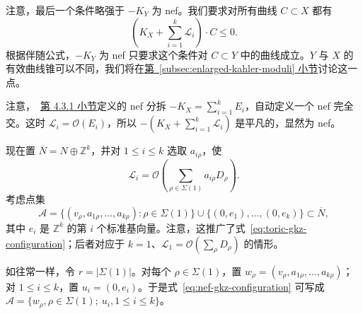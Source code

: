 注意，最后一个条件略强于 $-K_Y$ 为 nef。我们要求对所有曲线 $C\subset X$ 都有
\[
\left(K_X+\sum_{i=1}^k\mathcal L_i\right)\cdot C\leq0.
\]
根据伴随公式，$-K_Y$ 为 nef 只要求这个条件对 $C\subset Y$ 中的曲线成立。$Y$ 与 $X$ 的有效曲线锥可以不同，我们将在\hyperref[subsec:enlarged-kahler-moduli]{第~\ref*{subsec:enlarged-kahler-moduli} 小节}讨论这一点。

注意，~\hyperref[subsec:nef-partitions]{第 4.3.1 小节}定义的 nef 分拆
$-K_X=\sum_{i=1}^kE_i$，自动定义一个 nef 完全交。这时 $\mathcal L_i=\mathcal O(E_i)$，所以
$-(K_X+\sum_{i=1}^k\mathcal L_i)$ 是平凡的，显然为 nef。

现在置 $\overline N=N\oplus\mathbb Z^k$，并对 $1\leq i\leq k$ 选取 $a_{i\rho}$，使
\[
\mathcal L_i=\mathcal O\left(\sum_{\rho\in\Sigma(1)}a_{i\rho}D_\rho\right).
\]
考虑点集
\begin{equation}\label{eq:nef-gkz-configuration}
\mathcal A=\{(v_\rho,a_{1\rho},\ldots,a_{k\rho}):\rho\in\Sigma(1)\}
\cup\{(0,e_1),\ldots,(0,e_k)\}\subset\overline N,
\end{equation}
其中 $e_i$ 是 $\mathbb Z^k$ 的第 $i$ 个标准基向量。注意，这推广了式~\eqref{eq:toric-gkz-configuration}；后者对应于 $k=1$、$\mathcal L_1=\mathcal O(\sum_\rho D_\rho)$ 的情形。

如往常一样，令 $r=|\Sigma(1)|$。对每个 $\rho\in\Sigma(1)$，置
$w_\rho=(v_\rho,a_{1\rho},\ldots,a_{k\rho})$；对 $1\leq i\leq k$，置 $u_i=(0,e_i)$。于是式~\eqref{eq:nef-gkz-configuration} 可写成
$\mathcal A=\{w_\rho,\rho\in\Sigma(1);\ u_i,1\leq i\leq k\}$。

